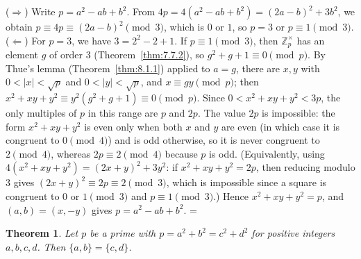\documentclass[11pt]{article}
\makeatletter
\theoremstyle{ntstyle}
\newtheorem{theorem}{Theorem}[subsection]
\let\nt@closedisplay\]
\def\nt@guardedclose{\@ifnextchar\par{\nt@closeafterpar}{\@ifnextchar\end{\postdisplaypenalty\@M\nt@closedisplay}{\nt@closedisplay}}}
\def\nt@closeafterpar\par{\@ifnextchar\par{\nt@closeafterpar}{\@ifnextchar\end{\postdisplaypenalty\@M\nt@closedisplay\par}{\nt@closedisplay\par}}}
\renewenvironment{proof}[1][\proofname]{\par
  \pushQED{\qed}\normalfont\topsep\medskipamount\edef\nt@afterproof{\@endparpenalty=\the\@endparpenalty\relax}\@beginparpenalty\@M\@endparpenalty\@M\let\]\nt@guardedclose\trivlist\item[]\textit{#1\@addpunct{.}} \ignorespaces}{\ifvmode\addpenalty\@M\fi\popQED\nt@afterproof\endtrivlist\@endpefalse}
\newcommand{\ZmodUnits}[1]{\mathbb{Z}_{#1}^{\times}}
\makeatother
\begin{document}
\begin{proof} ($\Rightarrow$) Write $p = a^2 - ab + b^2$. From $4p = 4(a^2 - ab + b^2) =
		(2a - b)^2 + 3b^2$, we obtain $p \equiv 4p \equiv (2a - b)^2 \pmod{3}$, which is $0$ or
	$1$, so $p = 3$ or $p \equiv 1 \pmod{3}$. ($\Leftarrow$) For $p = 3$,
	we have $3 = 2^2 - 2 + 1$. If $p \equiv 1 \pmod{3}$, then
	$\ZmodUnits{p}$ has an element $g$ of order $3$ (Theorem~\ref{thm:7.7.2}), so $g^2 + g + 1 \equiv
	0 \pmod{p}$. By Thue's lemma (Theorem~\ref{thm:8.1.1}) applied to
	$a = g$, there are $x, y$ with $0<|x|<\sqrt{p}$ and $0<|y|<\sqrt{p}$, and $x \equiv
		gy \pmod{p}$; then $x^2 + xy + y^2 \equiv y^2(g^2 + g + 1) \equiv 0
		\pmod{p}$. Since $0 < x^2 + xy + y^2 < 3p$, the only multiples of $p$
	in this range are $p$ and $2p$. The value $2p$ is impossible: the
	form $x^2 + xy + y^2$ is even only when both $x$ and $y$ are even (in
	which case it is congruent to $0 \pmod{4}$) and is odd otherwise, so it is
	never congruent to $2 \pmod{4}$, whereas $2p \equiv 2 \pmod{4}$ because $p$
	is odd. (Equivalently, using $4(x^2 + xy + y^2) = (2x + y)^2 + 3y^2$:
	if $x^2 + xy + y^2 = 2p$, then reducing modulo $3$ gives $(2x + y)^2
		\equiv 2p \equiv 2 \pmod{3}$, which is impossible since a square is congruent to $0$
	or $1 \pmod{3}$ and $p \equiv 1 \pmod{3}$.) Hence $x^2 + xy + y^2 = p$,
	and $(a, b) = (x, -y)$ gives $p = a^2 - ab + b^2$.
\end{proof}
\begin{theorem}\label{thm:8.1.7} Let $p$ be a prime with $p = a^2 + b^2 = c^2 + d^2$
	for positive integers $a, b, c, d$. Then $\{a, b\} = \{c, d\}$.
\end{theorem}
\end{document}
